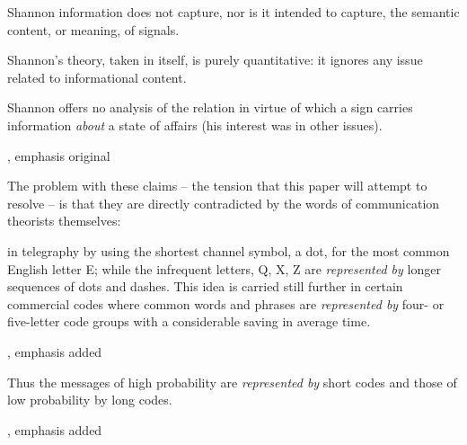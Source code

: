 \documentclass[12pt]{article}
\begin{document}
\begin{myquote}
Shannon information does not capture, nor is it intended to capture, the semantic content, or meaning, of signals.
\par\hspace*{\fill}\citet[21]{piccinini2011information}
\end{myquote}

\begin{myquote}
Shannon’s theory, taken in itself, is purely quantitative: it ignores any issue related to informational content.
\par\hspace*{\fill}\citet[1989]{lombardi2015shannon}
\end{myquote}

\begin{myquote}
Shannon offers no analysis of the relation in virtue of which a sign carries information \textit{about} a state of affairs (his interest was in other issues).
\par\hspace*{\fill}\citet[7]{neander2017mark}, emphasis original
\end{myquote}

\noindent The problem with these claims -- the tension that this paper will attempt to resolve -- is that they are directly contradicted by the words of communication theorists themselves:

\begin{myquote}
 in telegraphy by using the shortest channel symbol, a dot, for the most common English letter E; while the infrequent letters, Q, X, Z are \textit{represented by} longer sequences of dots and dashes. This idea is carried still further in certain commercial codes where common words and phrases are \textit{represented by} four- or five-letter code groups with a considerable saving in average time.
\par\hspace*{\fill}\citet[385]{shannon1948mathematicalc}, emphasis added
\end{myquote}

\begin{myquote}
Thus the messages of high probability are \textit{represented by} short codes and those of low probability by long codes.
\par\hspace*{\fill}\citet[402]{shannon1948mathematicalc}, emphasis added
\end{myquote}
\end{document}
